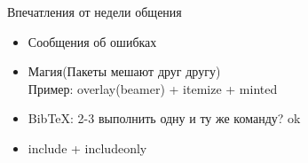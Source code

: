 
\begin{frame}{Впечатления от недели общения}
  \begin{itemize}
    \item Сообщения об ошибках
    \pause
    \item Магия(Пакеты мешают друг другу) \\
      Пример: overlay(beamer) + itemize + minted
    \pause  
    \item BibTeX: 2-3 выполнить одну и ту же команду? ok 
    \pause
    \item include + includeonly
  \end{itemize}
\end{frame}

